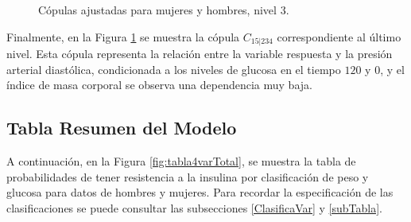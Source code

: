 \begin{figure}[H]
 \centering
    \caption{Cópulas ajustadas para mujeres y hombres, nivel $3$.}
    \label{fig:Modelo4TotalNivel4}
\end{figure}

Finalmente, en la Figura \ref{fig:Modelo4TotalNivel4} se muestra la cópula $C_{15|234}$ correspondiente al último nivel. Esta cópula representa la relación entre la variable respuesta y la presión arterial diastólica, condicionada a los niveles de glucosa en el tiempo $120$ y $0$, y el índice de masa corporal se observa una dependencia muy baja.



\subsection{Tabla Resumen del Modelo}

A continuación, en la Figura \ref{fig:tabla4varTotal}, se muestra la tabla de probabilidades de tener resistencia a la insulina por clasificación de peso y glucosa para datos de hombres y mujeres. Para recordar la especificación de las clasificaciones se puede consultar las subsecciones \ref{ClasificaVar} y \ref{subTabla}.


